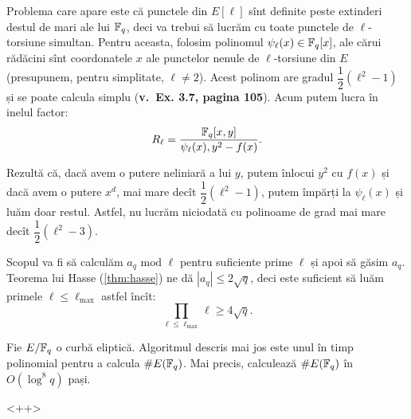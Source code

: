 Problema care apare este că punctele din $ E[\ell] $ sînt definite
peste extinderi destul de mari ale lui $ \mathbb{F}_q $, deci va trebui
să lucrăm cu toate punctele de $ \ell $-torsiune simultan. Pentru aceasta,
folosim polinomul $ \psi_\ell(x) \in \mathbb{F}_q[x] $, ale cărui rădăcini
sînt coordonatele $ x $ ale punctelor nenule de $ \ell $-torsiune
din $ E $ (presupunem, pentru simplitate, $ \ell \neq 2 $). Acest
polinom are gradul $ \dfrac{1}{2}(\ell^2 - 1) $ și se poate calcula
simplu ({\color{red}\textbf{v.\ Ex. 3.7, pagina 105}}). Acum putem lucra
în inelul factor:
\[
    R_\ell = \dfrac{\mathbb{F}_q[x, y]}{\psi_\ell(x), y^2 - f(x)}.
\]

Rezultă că, dacă avem o putere neliniară a lui $ y $, putem înlocui
$ y^2 $ cu $ f(x) $ și dacă avem o putere $ x^d $, mai mare decît
$ \dfrac{1}{2}(\ell^2 - 1) $, putem împărți la $ \psi_\ell(x) $ și luăm
doar restul. Astfel, nu lucrăm niciodată cu polinoame de grad mai mare
decît $ \dfrac{1}{2}(\ell^2 - 3) $.

Scopul va fi să calculăm $ a_q \text{ mod } \ell $ pentru suficiente
prime $ \ell $ și apoi să găsim $ a_q $. Teorema lui Hasse (\ref{thm:hasse})
ne dă $ |a_q| \leq 2 \sqrt{q} $, deci este suficient să luăm primele
$ \ell \leq \ell_{\max} $ astfel încît:
\[
    \prod_{\ell \leq \ell_{\max}} \ell \geq 4 \sqrt{q}.
\]

\begin{theorem}\label{thm:schoof}
   Fie $ E/\mathbb{F}_q $ o curbă eliptică. Algoritmul descris mai jos este
   unul în timp polinomial pentru a calcula $ \# E(\mathbb{F}_q) $. Mai precis,
   calculează $ \# E(\mathbb{F}_q) $ în $ O(\log^8 q) $ pași.
\end{theorem}
<++>
